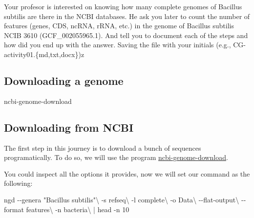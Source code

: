 \documentclass[
  letterpaper,
  DIV=11,
  numbers=noendperiod]{scrreprt}
\newenvironment{Shaded}{\begin{snugshade}}{\end{snugshade}}
\newcommand{\AttributeTok}[1]{\textcolor[rgb]{0.40,0.46,0.14}{#1}}
\newcommand{\DataTypeTok}[1]{\textcolor[rgb]{0.68,0.00,0.00}{#1}}
\newcommand{\ExtensionTok}[1]{\textcolor[rgb]{0.00,0.46,0.62}{#1}}
\newcommand{\FunctionTok}[1]{\textcolor[rgb]{0.28,0.35,0.67}{#1}}
\newcommand{\KeywordTok}[1]{\textcolor[rgb]{0.00,0.46,0.62}{#1}}
\newcommand{\NormalTok}[1]{\textcolor[rgb]{0.00,0.46,0.62}{#1}}
\newcommand{\StringTok}[1]{\textcolor[rgb]{0.13,0.47,0.30}{#1}}
\begin{document}
\begin{tcolorbox}[standard jigsaw,rightrule=.15mm, bottomtitle=1mm, toprule=.15mm, titlerule=0mm, toptitle=1mm, opacitybacktitle=0.6, arc=.35mm, colframe=quarto-callout-warning-color-frame, colbacktitle=quarto-callout-warning-color!10!white, coltitle=black, title=\textcolor{quarto-callout-warning-color}{\faExclamationTriangle}\hspace{0.5em}{Challenge}, bottomrule=.15mm, colback=white, leftrule=.75mm, left=2mm, opacityback=0]
Your profesor is interested on knowing how many complete genomes of
Bacillus subtilis are there in the NCBI databases. He ask you later to
count the number of features (genes, CDS, ncRNA, rRNA, etc.) in the
genome of Bacillus subtilis NCIB 3610 (GCF\_002055965.1). And tell you
to document each of the steps and how did you end up with the answer.
Saving the file with your initials (e.g.,
CG-activity01.\{md,txt,docx\})z
\end{tcolorbox}

\hypertarget{downloading-a-genome}{%
\subsection*{Downloading a genome}\label{downloading-a-genome}}

\begin{Shaded}
\begin{Highlighting}[]
\ExtensionTok{ncbi{-}genome{-}download}
\end{Highlighting}
\end{Shaded}

\hypertarget{downloading-from-ncbi}{%
\subsection*{Downloading from NCBI}\label{downloading-from-ncbi}}

The first step in this journey is to download a bunch of sequences
programatically. To do so, we will use the program
\href{https://github.com/kblin/ncbi-genome-download}{ncbi-genome-download}.

You could inspect all the options it provides, now we will set our
command as the following:

\begin{Shaded}
\begin{Highlighting}[]
\ExtensionTok{ngd} \AttributeTok{{-}{-}genera} \StringTok{"Bacillus subtilis"}\DataTypeTok{\textbackslash{}}
    \AttributeTok{{-}s}\NormalTok{ refseq}\DataTypeTok{\textbackslash{}}
    \AttributeTok{{-}l}\NormalTok{ complete}\DataTypeTok{\textbackslash{}}
    \AttributeTok{{-}o}\NormalTok{ Data}\DataTypeTok{\textbackslash{}}
    \AttributeTok{{-}{-}flat{-}output}\DataTypeTok{\textbackslash{}}
    \AttributeTok{{-}{-}format}\NormalTok{ features}\DataTypeTok{\textbackslash{}}
    \AttributeTok{{-}n}\NormalTok{ bacteria}\DataTypeTok{\textbackslash{}}
    \KeywordTok{|} \FunctionTok{head} \AttributeTok{{-}n}\NormalTok{ 10}
\end{Highlighting}
\end{Shaded}
\end{document}
